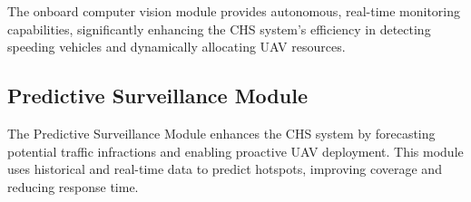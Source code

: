 The onboard computer vision module provides autonomous, real-time monitoring capabilities, significantly enhancing the CHS system’s efficiency in detecting speeding vehicles and dynamically allocating UAV resources.

\subsection{Predictive Surveillance Module}


The Predictive Surveillance Module enhances the CHS system by forecasting potential traffic infractions and enabling proactive UAV deployment. This module uses historical and real-time data to predict hotspots, improving coverage and reducing response time.

